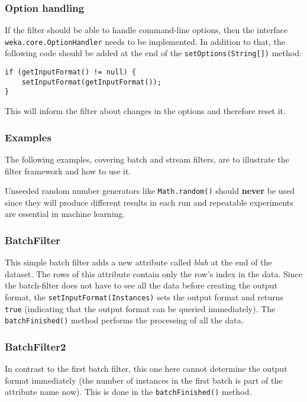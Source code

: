 \subsubsection*{Option handling}
\label{filter_optionhandling}
If the filter should be able to handle command-line options, then the interface
\texttt{weka.core.OptionHandler} needs to be implemented. In addition
to that, the following code should be added at the end of the
\texttt{setOptions(String[])} method:
\begin{verbatim}
if (getInputFormat() != null) {
    setInputFormat(getInputFormat());
}
\end{verbatim}
This will inform the filter about changes in the options and therefore reset it.

\newpage
\subsubsection{Examples}
The following examples, covering batch and stream filters, are to illustrate the
filter framework and how to use it.

Unseeded random number generators like \texttt{Math.random()} should
\textbf{never} be used since they will produce different results in each run and
repeatable experiments are essential in machine learning.

\subsubsection*{BatchFilter}
This simple batch filter adds a new attribute called \textit{blah} at the end of
the dataset. The rows of this attribute contain only the row's index in the
data. Since the batch-filter does not have to see all the data before creating
the output format, the \texttt{setInputFormat(Instances)} sets the output format
and returns \texttt{true} (indicating that the output format can be queried
immediately). The \texttt{batchFinished()} method performs the processing of all
the data.

{\scriptsize }

\newpage
\subsubsection*{BatchFilter2}
In contrast to the first batch filter, this one here cannot determine the output
format immediately (the number of instances in the first batch is part of the
attribute name now). This is done in the \texttt{batchFinished()} method.

